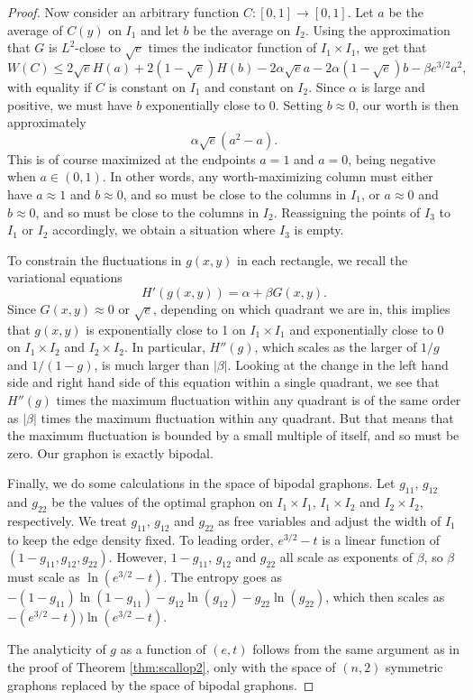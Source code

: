 \documentclass[10pt,a4paper]{amsart}
\newcommand\be{\begin{equation}}
\newcommand\ee{\end{equation}}
\newcommand{\Value}{worth}
\begin{document}
\begin{proof}
Now consider an arbitrary function $C: [0,1] \to [0,1]$. 
Let $a$ be the 
average of $C(y)$ on $I_1$ and let $b$ be the average on $I_2$. 
Using the approximation that $G$ is $L^2$-close to $\sqrt{e}$ 
times the indicator function of $I_1 \times I_1$, we get that 
\be W(C) \le 2\sqrt{e} H(a) + 2(1-\sqrt{e}) H(b) - 2\alpha \sqrt{e} a
- 2\alpha (1-\sqrt{e}) b - \beta e^{3/2} a^2, \ee
with equality if $C$ is constant on $I_1$ and constant on $I_2$. 
Since $\alpha$ is large and positive, we must have $b$ exponentially
close to 0. Setting $b \approx 0$, our \Value{} is then approximately
\be \alpha \sqrt{e} (a^2 - a). \ee
This is of course maximized at the endpoints $a=1$ and $a=0$, 
being negative when $a \in (0,1)$. In other words, 
any \Value-maximizing column must either have $a \approx 1$ and 
$b \approx 0$, and so must be close to the columns in $I_1$, or 
$a \approx 0$ and $b \approx 0$, and so must be close to the 
columns in $I_2$. Reassigning the points of $I_3$ to $I_1$ or $I_2$
accordingly, we obtain a situation where $I_3$ is empty. 

To constrain the fluctuations in $g(x,y)$ in each rectangle, we
recall the variational equations 
\be H'(g(x,y)) = \alpha + \beta G(x,y). \ee
Since $G(x,y) \approx 0$ or $\sqrt{e}$, depending on which 
quadrant we are in, this implies that $g(x,y)$ is exponentially 
close to 1 on $I_1 \times I_1$ and exponentially close to 
0 on $I_1 \times I_2$ and $I_2 \times I_2$. In particular, $H''(g)$,
which scales as the larger of $1/g$ and $1/(1-g)$, is much larger
than $|\beta|$. Looking at the change in the left hand side and 
right hand side of this equation within a single quadrant, we 
see that $H''(g)$ times the maximum fluctuation within any quadrant
is of the same order as $|\beta|$ times the maximum fluctuation 
within any quadrant. But that means that the maximum fluctuation is 
bounded by a small multiple of itself, and so must be zero. Our 
graphon is exactly bipodal. 

Finally, we do some calculations in the space of bipodal graphons. 
Let $g_{11}$, $g_{12}$ and $g_{22}$ be the values of the
optimal graphon on $I_1 \times I_1$, $I_1 \times I_2$ and $I_2 \times I_2$,
respectively. We treat $g_{11}$, $g_{12}$ and $g_{22}$ as free variables
and adjust the width of $I_1$ to keep the edge density fixed. To 
leading order, $e^{3/2}-t$ is a linear function of $(1-g_{11}, g_{12},
g_{22})$. However, $1-g_{11}$, $g_{12}$ and $g_{22}$ all scale as 
exponents of $\beta$, so $\beta$ must scale as $\ln(e^{3/2}-t)$. 
The entropy goes as $-(1-g_{11})\ln(1-g_{11}) - g_{12} \ln(g_{12})
- g_{22} \ln(g_{22})$, which then scales as $-(e^{3/2}-t)) \ln(e^{3/2}-t)$.

The analyticity of $g$ as a function of $(e,t)$ follows from the 
same argument as in the proof of Theorem \ref{thm:scallop2}, only with
the space of $(n,2)$ symmetric graphons replaced by the space of
bipodal graphons. 

\end{proof}
\end{document}
